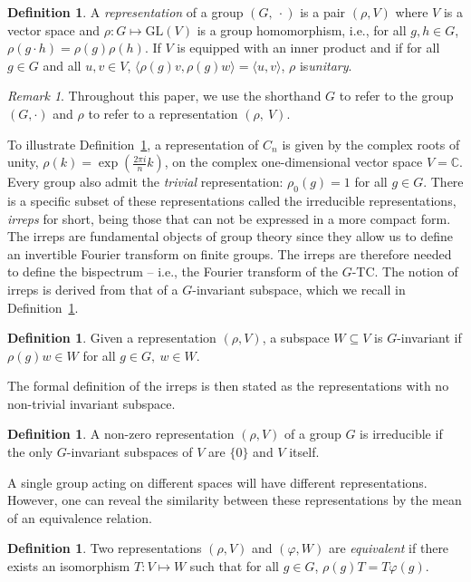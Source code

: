 \documentclass{article}
\theoremstyle{plain}
\theoremstyle{definition}
\newtheorem{definition}[theorem]{Definition}
\theoremstyle{remark}
\newtheorem{remark}[theorem]{Remark}
\begin{document}
\begin{definition}\label{def:representation}
    A \emph{representation} of a group $(G,\ \cdot)$ is a pair $(\rho, V)$ where $V$ is a vector space and $\rho:G\mapsto \mathrm{GL}(V)$ is a group homomorphism, i.e., for all $g,h\in G$, $\rho(g\cdot h) = \rho(g)\rho(h)$. If $V$ is equipped with an inner product and if for all $g\in G$ and all $u,v\in V$,  $\langle\rho(g)v,\rho(g)w\rangle =\langle u, v\rangle$, $\rho$ is\emph{unitary}.
\end{definition}
\begin{remark}
    Throughout this paper, we use the shorthand $G$ to refer to the group $(G,\cdot )$ and $\rho$ to refer to a representation $(\rho,\ V)$.
\end{remark}
To illustrate Definition~\ref{def:representation}, a representation of $C_n$ is given by the complex roots of unity, $\rho(k) = \exp\left(\frac{2\pi i }{n}k\right)$, on the complex one-dimensional vector space $V= \mathbb{C}$. Every group also admit the \emph{trivial} representation: $\rho_0(g)=1$ for all $g \in G$. There is a specific subset of these representations called the irreducible representations, \emph{irreps} for short, being those that can not be expressed in a more compact form. The irreps are fundamental objects of group theory since they allow us to define an invertible Fourier transform on finite groups. The irreps are therefore needed to define the bispectrum -- i.e., the Fourier transform of the $G$-TC. The notion of irreps is derived from that of a $G$-invariant subspace, which we recall in Definition~\ref{def:invariantspace}.
\begin{definition}\label{def:invariantspace}
    Given a representation $(\rho, V)$, a subspace $W\subseteq V$ is $G$-invariant if $\rho(g)w\in W$ for all $g\in G,\ w\in W$.
\end{definition}
The formal definition of the irreps is then stated as the representations with no non-trivial invariant subspace.
\begin{definition}
    A non-zero representation $(\rho,V)$ of a group $G$ is irreducible if the only $G$-invariant subspaces of $V$ are $\{0\}$ and $V$ itself.
\end{definition}
A single group acting on different spaces will have different representations. However, one can reveal the similarity between these representations by the mean of an equivalence relation.
\begin{definition}\label{def:equivalence}
    Two representations $(\rho,V)$ and $(\varphi, W)$ are \emph{equivalent} if there exists an isomorphism $T:V\mapsto W$ such that for all $g\in G$, $\rho(g) T = T \varphi(g)$.
\end{definition}
\end{document}
